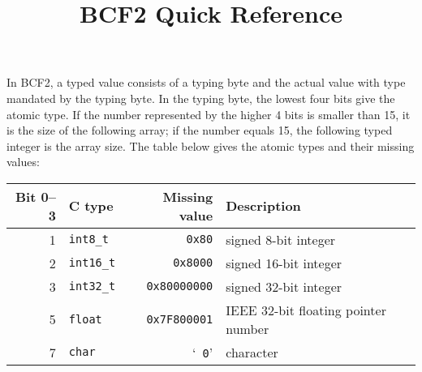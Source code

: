 \documentclass[10pt]{article}
\title{BCF2 Quick Reference}
\author{}
\date{}
\begin{document}
\maketitle

{\small
In BCF2, a typed value consists of a typing byte and the actual value with type
mandated by the typing byte. In the typing byte, the lowest four bits give the
atomic type. If the number represented by the higher 4 bits is smaller than 15,
it is the size of the following array; if the number equals 15, the following
typed integer is the array size. The table below gives the atomic types and
their missing values:
\begin{center}
{\small\begin{tabular}{rlrl}
\hline
Bit 0--3 & C type & Missing value & Description \\
\hline
1 & {\tt int8\_t}   & {\tt 0x80}               & signed 8-bit integer \\
2 & {\tt int16\_t}  & {\tt 0x8000}             & signed 16-bit integer \\
3 & {\tt int32\_t}  & {\tt 0x80000000}         & signed 32-bit integer \\
5 & {\tt float}     & {\tt 0x7F800001}         & IEEE 32-bit floating pointer number \\
7 & {\tt char}      & `{\tt \char92 0}'        & character \\
\hline
\end{tabular}}
\end{center}
}
\end{document}
